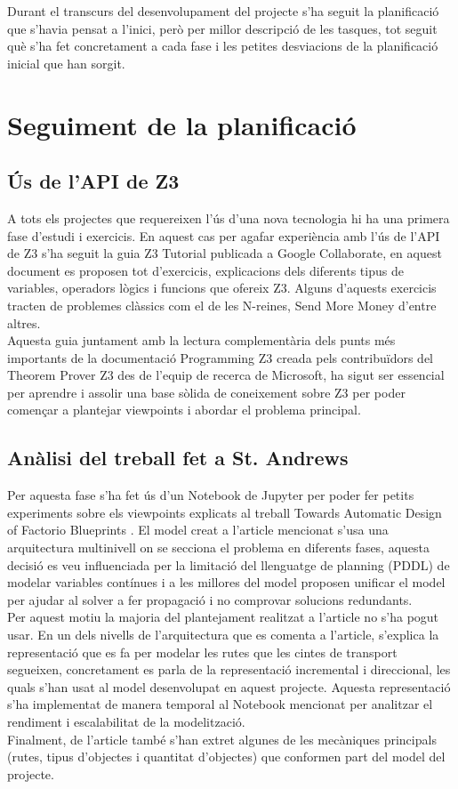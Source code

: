 Durant el transcurs del desenvolupament del projecte s'ha seguit la planificació que s'havia pensat a l'inici, però per millor descripció de les tasques, tot seguit què s'ha fet concretament a cada fase i les petites desviacions de la planificació inicial que han sorgit.

\section{Seguiment de la planificació}
\subsection{Ús de l'API de Z3}
A tots els projectes que requereixen l'ús d'una nova tecnologia hi ha una primera fase d'estudi i exercicis. En aquest cas per agafar experiència amb l'ús de l'API de Z3 s'ha seguit la guia Z3 Tutorial \cite{Z3Tutorial} publicada a Google Collaborate, en aquest document es proposen tot d'exercicis, explicacions dels diferents tipus de variables, operadors lògics i funcions que ofereix Z3. Alguns d'aquests exercicis tracten de problemes clàssics com el de les N-reines, Send More Money d'entre altres.\\
Aquesta guia juntament amb la lectura complementària dels punts més importants de la documentació Programming Z3 \cite{Z3Documentation} creada pels contribuïdors del Theorem Prover Z3 des de l'equip de recerca de Microsoft, ha sigut ser essencial per aprendre i assolir una base sòlida de coneixement sobre Z3 per poder començar a plantejar viewpoints i abordar el problema principal.

\subsection{Anàlisi del treball fet a St. Andrews}
Per aquesta fase s'ha fet ús d'un Notebook de Jupyter per poder fer petits experiments sobre els viewpoints explicats al treball Towards Automatic Design of Factorio Blueprints \cite{arxivpaper}. El model creat a l'article mencionat s'usa una arquitectura multinivell on se secciona el problema en diferents fases, aquesta decisió es veu influenciada per la limitació del llenguatge de planning (PDDL) de modelar variables contínues i a les millores del model proposen unificar el model per ajudar al solver a fer propagació i no comprovar solucions redundants.\\
Per aquest motiu la majoria del plantejament realitzat a l'article no s'ha pogut usar. En un dels nivells de l'arquitectura que es comenta a l'article, s'explica la representació que es fa per modelar les rutes que les cintes de transport segueixen, concretament es parla de la representació incremental i direccional, les quals s'han usat al model desenvolupat en aquest projecte. Aquesta representació s'ha implementat de manera temporal al Notebook mencionat per analitzar el rendiment i escalabilitat de la modelització.\\
Finalment, de l'article també s'han extret algunes de les mecàniques principals (rutes, tipus d'objectes i quantitat d'objectes) que conformen part del model del projecte.

